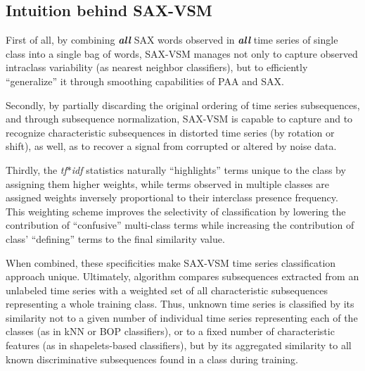 \documentclass[conference]{IEEEtran}
\begin{document}
\subsection{Intuition behind SAX-VSM}
First of all, by combining \textit{\textbf{all}} SAX words observed in \textit{\textbf{all}}
time series of single class into a single bag of words, SAX-VSM manages not only to capture 
observed intraclass variability (as nearest neighbor classifiers), but to efficiently 
``generalize''  it through smoothing capabilities of PAA and SAX.  

Secondly, by partially discarding the original ordering of time series subsequences, and
through subsequence normalization, SAX-VSM is capable to capture and to recognize 
characteristic subsequences in distorted time series (by rotation or shift), as well,
as to recover a signal from corrupted or altered by noise data. 

Thirdly, the \textit{tf$\ast$idf} statistics naturally ``highlights'' terms unique to the
class by assigning them higher weights, while terms observed in multiple classes are 
assigned weights inversely proportional to their interclass presence frequency. 
This weighting scheme improves the selectivity of classification by  lowering the 
contribution of ``confusive'' multi-class terms while increasing  the contribution 
of  class' ``defining'' terms to the final similarity value.   

When combined, these specificities make SAX-VSM time series classification approach 
unique. 
Ultimately, algorithm compares subsequences extracted from an unlabeled time series with 
a weighted set of all characteristic subsequences representing a whole training class. 
Thus, unknown time series is classified by its similarity not to a given number of individual 
time series representing each of the classes (as in kNN or BOP classifiers), or to a fixed 
number of  characteristic features (as in shapelets-based classifiers), but by its aggregated 
similarity to all known discriminative subsequences found in a class during training.
\end{document}
